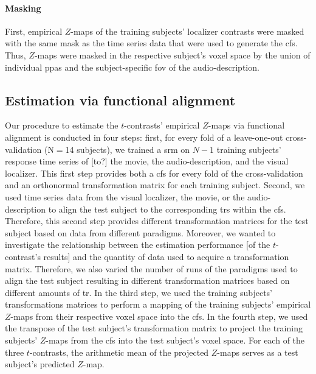 \paragraph{Masking}

%
First, empirical $Z$-maps of the training subjects' localizer contrasts were
masked with the same mask as the time series data that were used to generate the
\ac{cfs}.
%
Thus, $Z$-maps were masked in the respective subject's voxel space by the union
of individual \acp{ppa} \citep[cf.][that was warped from MNI152 space into each
subjects' voxel space]{haeusler2022processing} and the subject-specific \ac{fov}
of the audio-description.



\subsection{Estimation via functional alignment}
%
Our procedure to estimate the $t$-contrasts' empirical $Z$-maps via functional
alignment is conducted in four steps:
first, for every fold of a leave-one-out cross-validation (N$=$14 subjects), we
trained a \ac{srm} on $N-1$ training subjects' response time series
of [to?] the movie, the audio-description, and the visual localizer.
This first step provides both a \ac{cfs} for every fold of the cross-validation
and an orthonormal transformation matrix for each training subject.
Second, we used time series data from the visual localizer, the movie, or the
audio-description to align the test subject to the corresponding \acp{tr} within
the \ac{cfs}.
%
Therefore, this second step provides different transformation matrices for the
test subject based on data from different paradigms.
Moreover, we wanted to investigate the relationship between the estimation
performance [of the $t$-contrast's results] and the quantity of data used to
acquire a transformation matrix.
Therefore, we also varied the number of runs of the paradigms used to align the
test subject resulting in different transformation matrices based on different
amounts of \ac{tr}.
In the third step, we used the training subjects' transformations matrices to
perform a mapping of the training subjects' empirical $Z$-maps from their
respective voxel space into the \ac{cfs}.
In the fourth step, we used the transpose of the test subject's transformation
matrix to project the training subjects' $Z$-maps from the \ac{cfs} into the
test subject's voxel space.
For each of the three $t$-contrasts, the arithmetic mean of the projected
$Z$-maps serves as a test subject's predicted $Z$-map.



